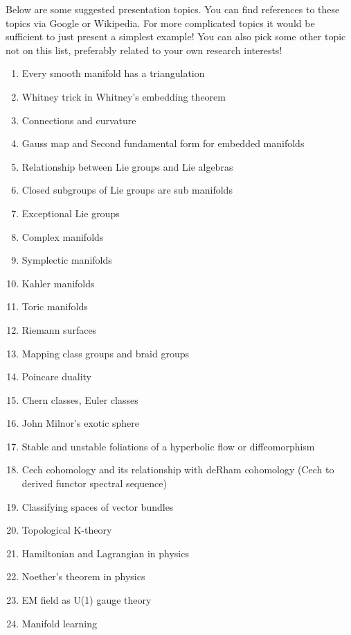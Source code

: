 \documentclass{article}
\theoremstyle{definition}
\begin{document}
Below are some suggested presentation topics. You can find references to these topics via Google or Wikipedia. For more complicated topics it would be sufficient to just present a simplest example! You can also pick some other topic not on this list, preferably related to your own research interests!

\begin{enumerate}
\item Every smooth manifold has a triangulation
\item Whitney trick in Whitney’s embedding theorem
\item Connections and curvature
\item Gauss map and Second fundamental form for embedded manifolds
\item Relationship between Lie groups and Lie algebras
\item Closed subgroups of Lie groups are sub manifolds
\item Exceptional Lie groups
\item Complex manifolds
\item Symplectic manifolds 
\item Kahler manifolds
\item Toric manifolds
\item Riemann surfaces
\item Mapping class groups and braid groups
\item Poincare duality
\item Chern classes, Euler classes
\item John Milnor’s exotic sphere
\item Stable and unstable foliations of a hyperbolic flow or diffeomorphism
\item Cech cohomology and its relationship with deRham cohomology (Cech to derived functor spectral sequence)
\item Classifying spaces of vector bundles
\item Topological K-theory
\item Hamiltonian and Lagrangian in physics
\item Noether’s theorem in physics
\item EM field as U(1) gauge theory 
\item Manifold learning
\end{enumerate}
\end{document}
